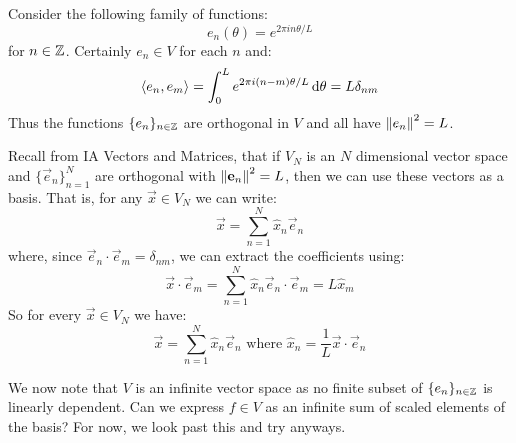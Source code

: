 \documentclass[../main.tex]{subfiles}
\begin{document}
Consider the following family of functions:
\[
  e_{n}(\theta) = e^{2 \pi i n \theta/ L}
\]
for $n \in \mathbb{Z}$.
Certainly $e_n \in V$ for each $n$ and:
\[
  \langle e_n, e_m \rangle = \int_{0}^{L} e^{2\pi i (n - m) \theta/L} \d{\theta} = L \delta_{n m}
\]
Thus the functions $\{e_n\}_{n \in \mathbb{Z}}$ are orthogonal in $V$ and all have $\left\lVert e_n \right\rVert^2 = L$.
\begin{remark}
  Recall from IA Vectors and Matrices, that if $V_N$ is an $N$ dimensional vector space and $\{\vec{e}_n\}^{N}_{n = 1}$ are orthogonal with $\left\lVert \mathbf{\bm{e}}_n \right\rVert^2 = L$, then we can use these vectors as a basis.
  That is, for any $\vec{x} \in V_N$ we can write:
  \[
    \vec{x} = \sum_{n = 1}^{N} \hat{x}_n \vec{e}_n
  \]
  where, since $\vec{e}_n \cdot \vec{e}_m = \delta_{n m}$, we can extract the coefficients using:
  \[
    \vec{x} \cdot \vec{e}_m = \sum_{n = 1}^{N} \hat{x}_n \vec{e}_n \cdot \vec{e}_m = L\hat{x}_{m}
  \]
  So for every $\vec{x} \in V_N$ we have:
  \[
    \vec{x} = \sum_{n = 1}^{N} \hat{x}_n \vec{e}_n \text{ where } \hat{x}_n = \frac{1}{L} \vec{x} \cdot \vec{e}_n
  \]
\end{remark}
We now note that $V$ is an infinite vector space as no finite subset of $\{e_n\}_{n \in \mathbb{Z}}$ is linearly dependent.
Can we express $f \in V$ as an infinite sum of scaled elements of the basis?
For now, we look past this and try anyways.
\end{document}
